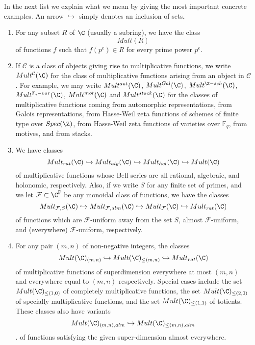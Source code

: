 \documentclass[a4paper]{article}
\begin{document}
In the next list we explain what we mean by giving the most important concrete examples. An arrow $\hookrightarrow$ simply denotes an inclusion of sets.

\begin{enumerate}
\item For any subset $R$ of $\C$ (usually a subring), we have the class
$$Mult(R)$$ 
of functions $f$ such that $f(p^e) \in R$ for every prime power $p^e$. 
\item If $\mathcal{C}$ is a class of objects giving rise to multiplicative functions, we write $Mult^{\mathcal{C}}(\C)$ for the class of multiplicative functions arising from an object in $\mathcal{C}$. For example, we may write $Mult^{aut}(\C)$, $Mult^{Gal}(\C)$, $Mult^{\Z-sch}(\C)$, $Mult^{\mathbb{F}_q-var}(\C)$, $Mult^{mot}(\C)$ and $Mult^{stack}(\C)$ for the classes of multiplicative functions coming from automorphic representations, from Galois representations, from Hasse-Weil zeta functions of schemes of finite type over $Spec(\Z)$, from Hasse-Weil zeta functions of varieties over $\mathbb{F}_q$, from motives, and from stacks. 
\item We have classes 
$$Mult_{rat}(\C) \hookrightarrow Mult_{alg}(\C) \hookrightarrow Mult_{hol}(\C) \hookrightarrow Mult(\C) $$ 
of multiplicative functions whose Bell series are all rational, algebraic, and holonomic, respectively. Also, if we write $S$ for any finite set of primes, and we let $\mathcal{F} \subset \C^{\mathbb{P}}$ be any monoidal class of functions, we have the classes 
$$ Mult_{\mathcal{F}, S}(\C) \hookrightarrow Mult_{\mathcal{F}, alm}(\C) \hookrightarrow Mult_{\mathcal{F}}(\C)  \hookrightarrow Mult_{rat}(\C)   $$
of functions which are $\mathcal{F}$-uniform away from the set $S$, almost $\mathcal{F}$-uniform, and (everywhere) $\mathcal{F}$-uniform, respectively.
\item For any pair $(m, n)$ of non-negative integers, the classes
$$ Mult(\C)_{(m, n)} \hookrightarrow Mult(\C)_{\leq (m, n)}  \hookrightarrow Mult_{rat}(\C)$$
of multiplicative functions of superdimension everywhere at most $(m, n)$ and everywhere equal to $(m, n)$ respectively. Special cases include the set $Mult(\C)_{\leq (1, 0)}$ of completely multiplicative functions, the set $Mult(\C)_{\leq (2, 0)}$ of specially multiplicative functions, and the set $Mult(\C)_{\leq (1, 1)}$ of totients. These classes also have variants 
$$Mult(\C)_{(m, n), alm} \hookrightarrow Mult(\C)_{ \leq (m, n), alm}$$.
of functions satisfying the given super-dimension almost everywhere.


\end{enumerate}
\end{document}
